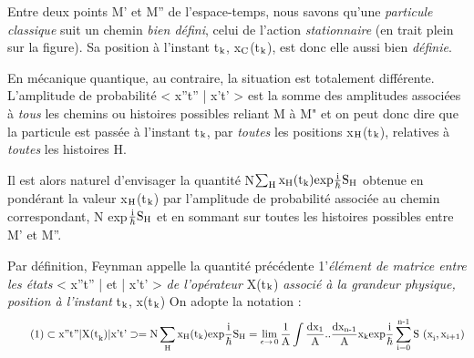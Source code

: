 \begin{center}  \end{center}
Entre deux points M' et M'' de l'espace-temps, nous savons
qu'une {\it particule classique} suit un chemin {\it bien défini}, celui de l'action
{\it stationnaire} (en trait plein sur la figure). Sa position à l'instant t$_{\text{k}}$,
x$_{\text{C}}$(t$_{\text{k}}$), est donc elle aussi bien {\it définie}.

En mécanique quantique, au contraire, la situation est totalement différente. L'amplitude de probabilité < x''t'' | x't' > est la somme
des amplitudes associées à {\it tous} les chemins ou histoires possibles reliant
M à M" et on peut donc dire que la particule est passée à l'instant t$_{\text{k}}$, par
{\it toutes} les positions x$_{\text{H}}$(t$_{\text{k}}$), relatives à {\it toutes} les histoires H.

Il est alors naturel d'envisager la quantité
N$\sum_{\text{H}} \text{x}_{\text{H}} (\text{t}_{\text{k}}) \text{exp} \frac{\text{i}}{\hbar} \text{S}_{\text{H}}$
obtenue en pondérant la valeur x$_{\text{H}}$(t$_{\text{k}}$) par l'amplitude de probabilité associée
au chemin correspondant, N exp$\frac{\text{i}}{\hbar} \text{S}_{\text{H}}$ et en sommant sur toutes les histoires
possibles entre M' et M''.

{\it }Par définition, Feynman appelle la quantité précédente 1'{\it élément
de matrice entre les états} < x''t'' | et | x't' > {\it de l'opérateur} X(t$_{\text{k}}$) {\it associé
à la grandeur physique, position à l'instant} t$_{\text{k}}$, x(t$_{\text{k}}$)
On adopte la notation :
\[
\tag{1}\subset \text{x''t''} | \text{X(t}_{\text{k}}) | \text{x't'}\supset =
\text{N}\sum_{\text{H}} \text{x}_{\text{H}} (\text{t}_{\text{k}}) \text{exp} \frac{\text{i}}{\hbar} \text{S}_{\text{H}}
=\lim_{\epsilon \to \,0} \frac{1}{\text{A}}
\int \frac{\text{dx}_1}{\text{A}}..\frac{\text{dx}_{\text{n-1}}}{\text{A}} \text{x}_{\text{k}}
\text{exp} \frac{\text{i}}{\hbar} \sum_{\text{i=0}}^{\text{n-1}}
\text{S (x}_{\text{i}}, \text{x}_{\text{i+1}})
\]

